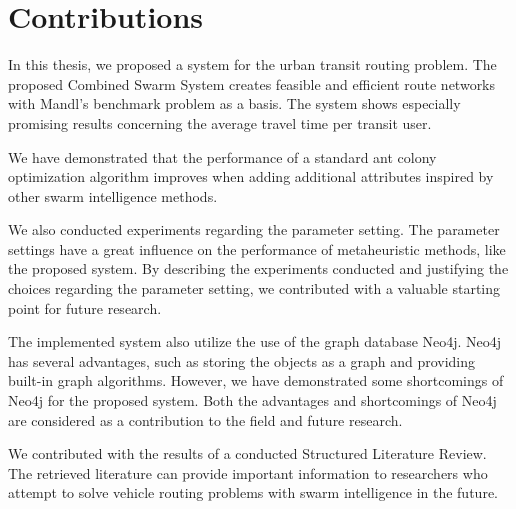 \section{Contributions}
\label{sec:contributions}

%

In this thesis, we proposed a system for the urban transit routing problem. The proposed Combined Swarm System creates feasible and efficient route networks with Mandl's benchmark problem \citep{mandl79} as a basis. The system shows especially promising results concerning the average travel time per transit user. 

We have demonstrated that the performance of a standard ant colony optimization algorithm improves when adding additional attributes inspired by other swarm intelligence methods. 

We also conducted experiments regarding the parameter setting. The parameter settings have a great influence on the performance of metaheuristic methods, like the proposed system. By describing the experiments conducted and justifying the choices regarding the parameter setting, we contributed with a valuable starting point for future research. 

The implemented system also utilize the use of the graph database Neo4j. Neo4j has several advantages, such as storing the objects as a graph and providing built-in graph algorithms. However, we have demonstrated some shortcomings of Neo4j for the proposed system. Both the advantages and shortcomings of Neo4j are considered as a contribution to the field and future research. 

We contributed with the results of a conducted Structured Literature Review. The retrieved literature can provide important information to researchers who attempt to solve vehicle routing problems with swarm intelligence in the future. 




